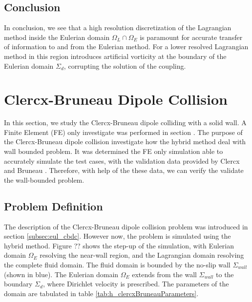 \subsection{Conclusion}

In conclusion, we see that a high resolution discretization of the Lagrangian method inside the Eulerian domain $\Omega_L \cap \Omega_E$ is paramount for accurate transfer of information to and from the Eulerian method. For a lower resolved Lagrangian method in this region introduces artificial vorticity at the boundary of the Eulerian domain $\Sigma_d$, corrupting the solution of the coupling.

\section{Clercx-Bruneau Dipole Collision}

In this section, we study the Clercx-Bruneau dipole colliding with a solid wall. A Finite Element (FE) only investigate was performed in section . The purpose of the Clercx-Bruneau dipole collision investigate how the hybrid method deal with wall bounded problem. It was determined the FE only simulation able to accurately simulate the test cases, with the validation data provided by Clercx and Bruneau \cite{Clercx2006a}. Therefore, with help of the these data, we can verify the validate the wall-bounded problem.

\subsection{Problem Definition}

The description of the Clercx-Bruneau dipole collision problem was introduced in section \ref{subsec:eul_cbdc}. However now, the problem is simulated using the hybrid method. Figure ?? shows the step-up of the simulation, with Eulerian domain $\Omega_E$ resolving the near-wall region, and the Lagrangian domain resolving the complete fluid domain. The fluid domain is bounded by the no-slip wall $\Sigma_{wall}$ (shown in blue). The Eulerian domain $\Omega_E$ extends from the wall $\Sigma_{wall}$ to the boundary $\Sigma_{d}$, where Dirichlet velocity is prescribed. The parameters of the domain are tabulated in table \ref{tab:h_clercxBruneauParameters}.

